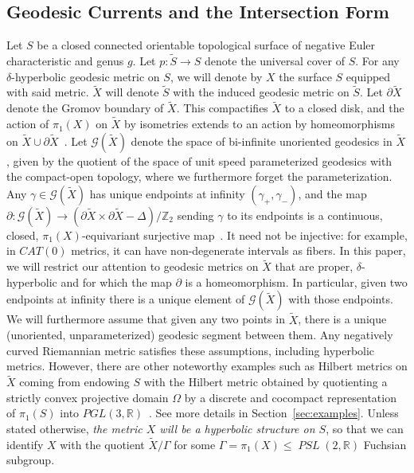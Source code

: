 \documentclass[12pt,article]{amsart}
\numberwithin{equation}{section}
\numberwithin{figure}{section}
\theoremstyle{definition}
\theoremstyle{plain}
\newcommand\R{\ensuremath{\mathbb{R}}}
\newcommand*{\wt}[1]{\widetilde{#1}}
\DeclareMathOperator{\PSL}{\mathit{PSL}}
\begin{document}
\subsection{Geodesic Currents and the Intersection Form}
\label{intro:curr}
 Let $S$ be a closed connected orientable topological surface of negative Euler characteristic and genus $g$.
 Let $p \colon \wt{S} \to S$ denote the universal cover of $S$. For any $\delta$-hyperbolic geodesic metric on $S$, we will denote by $X$ the surface $S$ equipped with said metric. $\wt{X}$ will denote $\wt{S}$ with the induced geodesic metric on $\wt{S}$.
Let $\partial \wt{X}$ denote the Gromov boundary of $\wt{X}$. This compactifies $\wt{X}$ to a closed disk, and the action of $\pi_1(X)$ on $\wt{X}$ by isometries extends to an action by homeomorphisms on $\wt{X} \cup \partial \wt{X}$~\cite[Chapter~III.H.3, 3.7~Proposition]{BH11:NonPosCurvature}.
Let $\mathcal{G}(\wt{X})$ denote the space of bi-infinite unoriented geodesics in $\wt{X}$, given by the quotient of the space of unit speed parameterized geodesics with the compact-open topology, where we furthermore forget the parameterization. Any $\gamma \in \mathcal{G}(\wt{X})$ has unique endpoints at infinity $(\gamma_+,\gamma_-)$, and the map $\partial \colon \mathcal{G}(\wt{X}) \to (\partial \wt{X} \times \partial \wt{X} - \Delta) / \mathbb{Z}_2$ sending $\gamma$ to its endpoints is a continuous, closed, $\pi_1(X)$-equivariant surjective map~\cite[Proposition~2.2]{BL18:Marked}. It need not be injective: for example, in $CAT(0)$ metrics, it can have non-degenerate intervals as fibers.
In this paper, we will restrict our attention to geodesic metrics on $\wt{X}$ that are proper, $\delta$-hyperbolic and for which the map $\partial$ is a homeomorphism. In particular, given two endpoints at infinity there is a unique element of $\mathcal{G}(\wt{X})$ with those endpoints.
We will furthermore assume that given any two points in $\wt{X}$, there is a unique (unoriented, unparameterized) geodesic segment between them.
Any negatively curved Riemannian metric satisfies these assumptions, including hyperbolic metrics. However, there are other noteworthy examples such as Hilbert metrics on $\wt{X}$ coming from endowing $S$ with the Hilbert metric obtained by quotienting a strictly convex projective domain $\Omega$ by a discrete and cocompact representation of $\pi_1(S)$ into $PGL(3,\mathbb{R})$~\cite[Page~99]{dlH93:Hilbert}. See more details in Section~\ref{sec:examples}. Unless stated otherwise, \emph{the metric $X$ will be a hyperbolic structure on $S$},  so that we can identify $X$ with the quotient $\wt{X} / \Gamma$ for some $\Gamma=\pi_1(X) \leq {\PSL(2,\R)}$ Fuchsian subgroup. 
\end{document}
